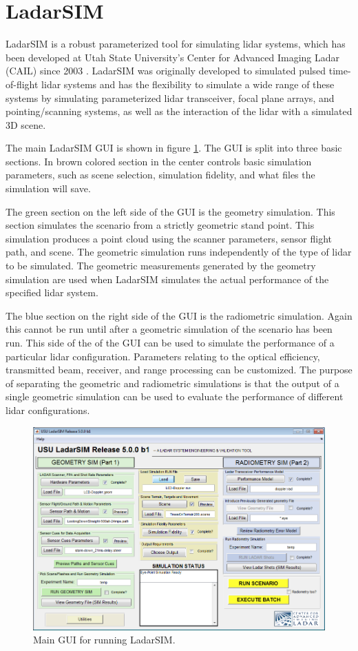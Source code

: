 \section{LadarSIM }

LadarSIM is a robust parameterized tool for simulating lidar systems, which has been
developed at Utah State University's Center for Advanced Imaging Ladar (CAIL) since 2003
\cite{budgeLeishman,neilsenBudge}. LadarSIM was originally developed to simulated pulsed 
time-of-flight lidar systems and has the flexibility to simulate
a wide range of these systems by simulating parameterized lidar transceiver, focal plane 
arrays, and pointing/scanning systems, as well as the interaction of the lidar with a 
simulated 3D scene. 

The main LadarSIM GUI is shown in figure \ref{fig:LadarSIM}. The GUI is split into three basic 
sections. In brown colored section in the center controls basic simulation parameters, such as
scene selection, simulation fidelity, and what files the simulation will save. 

The green section on the left side of the GUI is the geometry simulation. This section simulates
the scenario from a strictly geometric stand point. This simulation produces a point cloud using 
the scanner parameters, sensor flight path, and scene. The geometric simulation runs independently
of the type of lidar to be simulated. The geometric measurements generated by the geometry simulation
are used when LadarSIM simulates the actual performance of the specified lidar system. 

The blue section on the right side of the GUI is the radiometric simulation. Again this cannot be run
until after a geometric simulation of the scenario has been run. This side of the of the GUI can be used
to simulate the performance of a particular lidar configuration. Parameters relating to the optical efficiency, 
transmitted beam, receiver, and range processing can be customized. The purpose of separating the geometric 
and radiometric simulations is that the output of a single geometric simulation can be used to evaluate the 
performance of different lidar configurations. 

\begin{figure}[!htb]
	\centering
	\includegraphics[width=.8\columnwidth]{figs/LadarSIM}
	\vspace{1em}
	\caption{Main GUI for running LadarSIM.}
	\label{fig:LadarSIM}
\end{figure}
